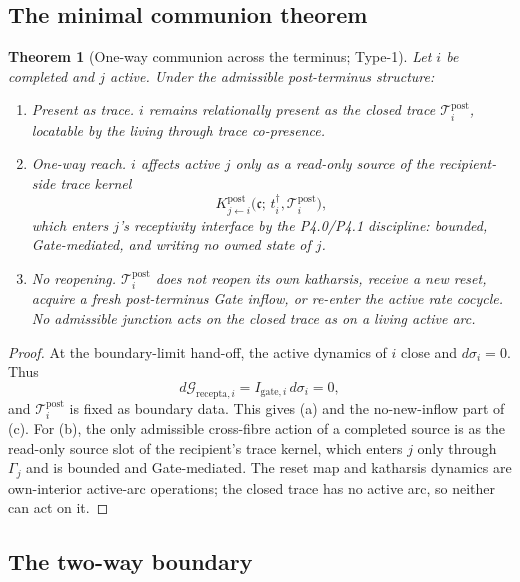 \documentclass[11pt,a4paper]{article}
\theoremstyle{definition}
\theoremstyle{plain}
\newtheorem{theorem}[definition]{Theorem}
\theoremstyle{remark}
\begin{document}
\subsection{The minimal communion theorem}

\begin{theorem}[One-way communion across the terminus; Type-1]\label{thm:terminus}
Let \(i\) be completed and \(j\) active. Under the admissible post-terminus
structure:
\begin{enumerate}[label=\textup{(\alph*)},leftmargin=1.2cm]
\item \emph{Present as trace.} \(i\) remains relationally present as the closed
trace \(\mathcal T_i^{\mathrm{post}}\), locatable by the living through trace
co-presence.
\item \emph{One-way reach.} \(i\) affects active \(j\) only as a read-only source of
the recipient-side trace kernel
\[
K^{\mathrm{post}}_{j\leftarrow i}
\bigl(\mathfrak c;\,t_i^\dagger,\mathcal T_i^{\mathrm{post}}\bigr),
\]
which enters \(j\)'s receptivity interface by the P4.0/P4.1 discipline: bounded,
Gate-mediated, and writing no owned state of \(j\).
\item \emph{No reopening.} \(\mathcal T_i^{\mathrm{post}}\) does not reopen its own
katharsis, receive a new reset, acquire a fresh post-terminus Gate inflow, or
re-enter the active rate cocycle. No admissible junction acts on the closed trace
as on a living active arc.
\end{enumerate}
\end{theorem}

\begin{proof}
At the boundary-limit hand-off, the active dynamics of \(i\) close and
\(d\sigma_i=0\). Thus
\[
d\mathcal G_{\mathrm{recepta},i}=I_{\mathrm{gate},i}\,d\sigma_i=0,
\]
and \(\mathcal T_i^{\mathrm{post}}\) is fixed as boundary data. This gives (a) and
the no-new-inflow part of (c). For (b), the only admissible cross-fibre action of a
completed source is as the read-only source slot of the recipient's trace kernel,
which enters \(j\) only through \(\Gamma_j\) and is bounded and Gate-mediated. The
reset map and katharsis dynamics are own-interior active-arc operations; the closed
trace has no active arc, so neither can act on it. \qedhere
\end{proof}

\subsection{The two-way boundary}
\end{document}
